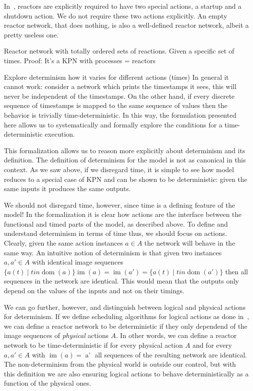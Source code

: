 \begin{defn}
\begin{defn}
\begin{defn}
\begin{defn}
In~\cite{lohstroh_phdthesis}, reactors are explicitly required to have two special actions, a startup and a shutdown action.
We do not require these two actions explicitly.
An empty reactor network, that does nothing, is also a well-defined reactor network, albeit a pretty useless one.

\begin{theorem}
Reactor network with totally ordered sets of reactions.
Given a specific set of times. 
Proof: It's a \ac{KPN} with processes = reactors
\end{theorem}
Explore determinism how it varies for different actions (times)
In general it cannot work: consider a network which prints the timestamps it sees, this will never be independent of the timestamps.
On the other hand, if every discrete sequence of timestamps is mapped to the same sequence of values then the behavior is trivially time-deterministic.
In this way, the formulation presented here allows us to systematically and formally explore the conditions for a time-deterministic execution.


This formalization allows us to reason more explicitly about determinism and its definition.
The definition of determinism for the model is not as canonical in this context.
As we saw above, if we disregard time, it is simple to see how model reduces to a special case of \ac{KPN} and can be shown to be deterministic: given the same inputs it produces the same outputs.

We should not disregard time, however, since time is a defining feature of the model!
In the formalization it is clear how actions are the interface between the functional and timed parts of the model, as described above.
To define and understand determinism in terms of time thus, we should focus on actions.
Clearly, given the same action instances $a \in A$ the network will behave in the same way.
An intuitive notion of determinism is that given two instances $a, a' \in A$ with identical image sequences $\{ a(t) \mid t in \operatorname{dom}(a) \} \operatorname{im}(a) = \operatorname{im}(a') = \{ a(t) \mid t in \operatorname{dom}(a') \}$ then all sequences in the network are identical.
This would mean that the outputs only depend on the values of the inputs and not on their timings.

We can go further, however, and distinguish between logical and physical actions for determinism. 
If we define scheduling algorithms for logical actions as done in~\cite{lohstroh_cyphy19,lohstroh_phdthesis}, we can define a reactor network to be deterministic if they only dependend of the image sequences of \emph{physical} actions $A$.
In other words, we can define a reactor network to be time-deterministic if for every physical action $A$ and for every $a, a' \in A$ with $\operatorname{im}(a) = \operatorname{a'}$ all sequences of the resulting network are identical.
The non-determinism from the physical world is outside our control, but with this definition we are also ensuring logical actions to behave deterministically as a function of the physical ones. 


\end{defn}
\end{defn}
\end{defn}
\end{defn}
